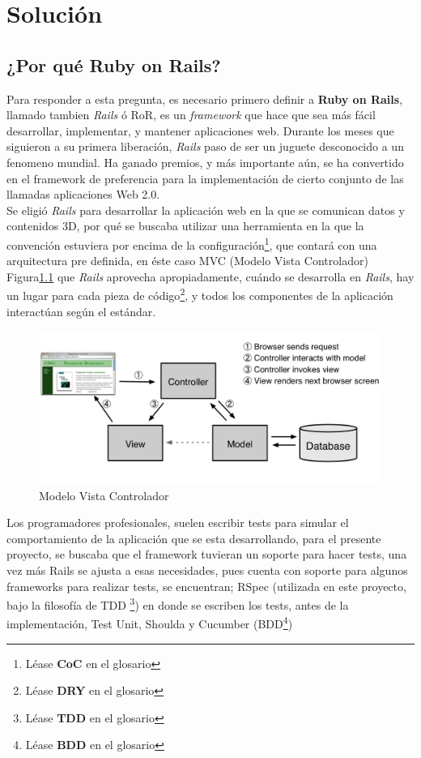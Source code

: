 \chapter{Solución}
\section{¿Por qué Ruby on Rails?}

Para responder a esta pregunta, es necesario primero definir a \textbf{Ruby on Rails}, llamado tambien \emph{Rails} ó RoR, es un \emph{framework} que hace que sea más fácil desarrollar, implementar, y mantener aplicaciones web. Durante los meses que siguieron a su primera liberación, \emph{Rails} paso de ser un juguete desconocido a un fenomeno mundial. Ha ganado premios, y más importante aún, se ha convertido en el framework de preferencia para la implementación de cierto conjunto de las llamadas aplicaciones Web 2.0\cite{ror:awdwr}.\\

Se eligió \emph{Rails} para desarrollar la aplicación web en la que se comunican datos y contenidos 3D, por qué se buscaba utilizar una herramienta en la que la convención estuviera por encima de la configuración\footnote{Léase \textbf{CoC} en el glosario}, que contará con una arquitectura pre definida, en éste caso MVC (Modelo Vista Controlador) Figura\ref{fig:mvc} que \emph{Rails} aprovecha apropiadamente, cuándo se desarrolla en \emph{Rails}, hay un lugar para cada pieza de código\footnote{Léase \textbf{DRY} en el glosario}, y todos los componentes de la aplicación interactúan según el estándar.\\

\begin{figure}[h]
	\centering
		\includegraphics[scale=0.25]{mvc.PNG}
		\caption{Modelo Vista Controlador}
	\label{fig:mvc}
\end{figure}

Los programadores profesionales, suelen escribir tests para simular el comportamiento de la aplicación que se esta desarrollando, para el presente proyecto, se buscaba que el framework tuvieran un soporte para hacer tests, una vez más Rails se ajusta a esas necesidades, pues cuenta con soporte para algunos frameworks para realizar tests, se encuentran; RSpec (utilizada en este proyecto, bajo la filosofía de TDD \footnote{Léase \textbf{TDD} en el glosario}) en donde se escriben los tests, antes de la implementación, Test Unit, Shoulda y Cucumber (BDD\footnote{Léase \textbf{BDD} en el glosario})\\

